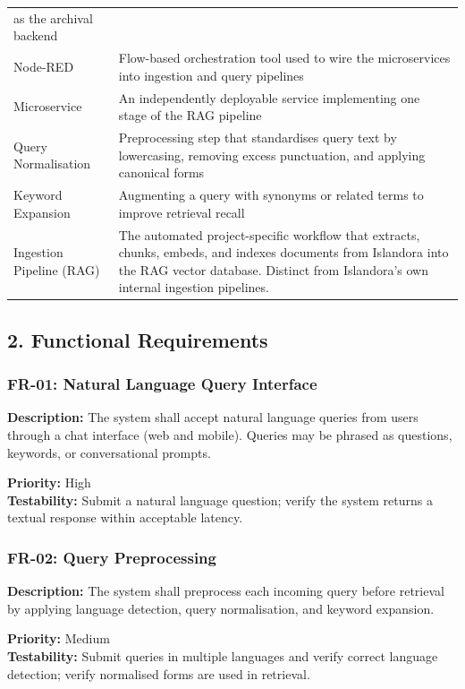 \documentclass[
  11pt,
]{article}
\begin{document}
{\begin{longtable}[]{@{}
  >{\raggedright\arraybackslash}p{}
  >{\raggedright\arraybackslash}p{}@{}}
as the archival backend \\
Node-RED & Flow-based orchestration tool used to wire the microservices
into ingestion and query pipelines \\
Microservice & An independently deployable service implementing one
stage of the RAG pipeline \\
Query Normalisation & Preprocessing step that standardises query text by
lowercasing, removing excess punctuation, and applying canonical
forms \\
Keyword Expansion & Augmenting a query with synonyms or related terms to
improve retrieval recall \\
Ingestion Pipeline (RAG) & The automated project-specific workflow that extracts,
chunks, embeds, and indexes documents from Islandora into the RAG
vector database. Distinct from Islandora's own internal ingestion
pipelines. \\
\end{longtable}
}

\subsection{2. Functional Requirements}\label{functional-requirements}

\subsubsection{FR-01: Natural Language Query
Interface}\label{fr-01-natural-language-query-interface}

\textbf{Description:} The system shall accept natural language queries
from users through a chat interface (web and mobile). Queries may be
phrased as questions, keywords, or conversational prompts.

\textbf{Priority:} High\\
\textbf{Testability:} Submit a natural language question; verify the
system returns a textual response within acceptable latency.

\subsubsection{FR-02: Query
Preprocessing}\label{fr-02-query-preprocessing}

\textbf{Description:} The system shall preprocess each incoming query
before retrieval by applying language detection, query normalisation,
and keyword expansion.

\textbf{Priority:} Medium\\
\textbf{Testability:} Submit queries in multiple languages and verify
correct language detection; verify normalised forms are used in
retrieval.
\end{document}
